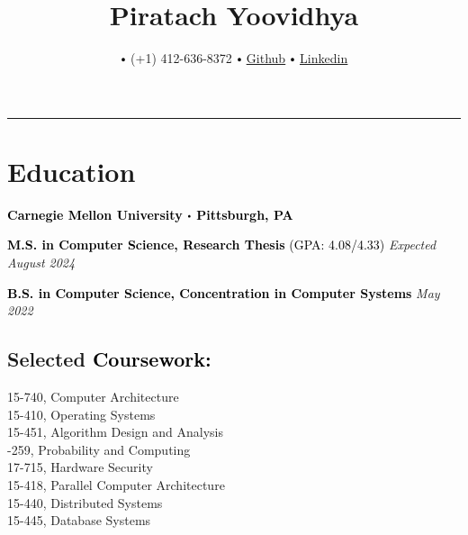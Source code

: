 \documentclass[10pt]{article}
\title{\bfseries\Huge Piratach Yoovidhya}
\author{
  \small \myemail
   $\sbullet[.75]$
   (+1) 412-636-8372
   $\sbullet[.75]$
   \href{https://github.com/Piratach}{\underline{Github}}
   $\sbullet[.75]$
  \href{https://www.linkedin.com/in/piratach-yoovidhya/}
  {\underline{Linkedin}}
}
\date{}
\newcommand\sbullet[1][.5]{\mathbin{\vcenter{\hbox{\scalebox{#1}{$\bullet$}}}}}
\begin{document}
  \maketitle
  \thispagestyle{empty}
  \vspace*{-1.0cm}
  \hrule
  \vspace*{-0.15cm}

  \section*{\Large \textcolor{lighterB}{Education}}
  \vspace*{-0.3cm}

  \textbf{\large \textcolor{Black}{Carnegie Mellon University $\sbullet$ Pittsburgh, PA}}

  \vspace{0.05cm}

\textcolor{Black}{\textbf{M.S. in Computer Science, Research Thesis} (GPA: 4.08/4.33)} \hfill \textit{Expected August 2024}

  \vspace{0.05cm}

\textcolor{Black}{\textbf{B.S. in Computer Science, Concentration in Computer Systems}} \hfill \textit{May 2022}

  \vspace{0.2cm}

  \vspace*{-0.5cm}

  \subsection*{Selected \textcolor{Black}{Coursework:}}

    \vspace*{-0.55cm}
    \begin{multicols}{2}
       15-740, Computer Architecture \\
       15-410, Operating Systems \\
       15-451, Algorithm Design and Analysis \\
       -259, Probability and Computing \\
       17-715, Hardware Security \\
       15-418, Parallel Computer Architecture \\
       15-440, Distributed Systems \\
       15-445, Database Systems
    \end{multicols}
\end{document}
